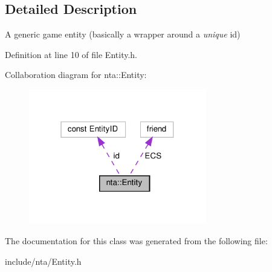 \subsection{Detailed Description}
A generic game entity (basically a wrapper around a {\itshape unique} id) 

Definition at line 10 of file Entity.\+h.



Collaboration diagram for nta\+:\+:Entity\+:
\nopagebreak
\begin{figure}[H]
\begin{center}
\leavevmode
\includegraphics[width=220pt]{db/dc2/classnta_1_1Entity__coll__graph}
\end{center}
\end{figure}


The documentation for this class was generated from the following file\+:\begin{DoxyCompactItemize}
\item 
include/nta/Entity.\+h\end{DoxyCompactItemize}
